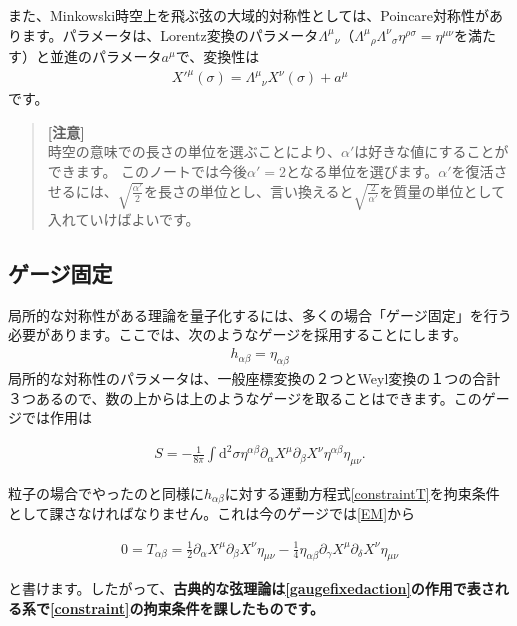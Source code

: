 \documentclass[report,paper=a4, fontsize=12pt, line_length=16cm, number_of_lines=34,dvipdfmx]{jlreq}
\newenvironment{important}{\begin{tcolorbox}[
  colback = white,
  colframe = red!35,
  boxrule = 2mm,
  fonttitle = \bfseries,
  after = \noindent] }{\end{tcolorbox}}
\numberwithin{equation}{chapter}
\numberwithin{equation}{section}
\newcommand{\del}{\partial}
\newcommand{\kyou}[1]{{\sffamily \bfseries #1}}
\newenvironment{remark}{\begin{quote}\small\textbf{[注意]}\\ }{\end{quote}}
\newcommand{\di}{\mathrm{d}}
\begin{document}
また、Minkowski時空上を飛ぶ弦の大域的対称性としては、Poincare対称性があります。パラメータは、Lorentz変換のパラメータ$\Lambda^{\mu}{}_{\nu}$（$\Lambda^{\mu}{}_{\rho}\Lambda^{\nu}{}_{\sigma}\eta^{\rho\sigma}=\eta^{\mu\nu}$を満たす）と並進のパラメータ$a^{\mu}$で、変換性は
\begin{align}
X'^{\mu}(\sigma)=\Lambda^{\mu}{}_{\nu}X^{\nu}(\sigma)+a^{\mu}
\end{align}
です。
\begin{remark}
時空の意味での長さの単位を選ぶことにより、$\alpha'$は好きな値にすることができます。
このノートでは今後$\alpha'=2$となる単位を選びます。$\alpha'$を復活させるには、$\sqrt{\frac{\alpha'}{2}}$を長さの単位とし、言い換えると$\sqrt{\frac{2}{\alpha'}}$を質量の単位として入れていけばよいです。
\end{remark}

\subsection{ゲージ固定}
局所的な対称性がある理論を量子化するには、多くの場合「ゲージ固定」を行う必要があります。ここでは、次のようなゲージを採用することにします。
\begin{align}
h_{\alpha\beta}=\eta_{\alpha\beta}
\end{align}
局所的な対称性のパラメータは、一般座標変換の２つとWeyl変換の１つの合計３つあるので、数の上からは上のようなゲージを取ることはできます。このゲージでは作用は
\begin{important}
  \begin{align}
    S=-\frac{1}{8\pi}\int \di^2\sigma \eta^{\alpha\beta}\del_{\alpha}X^{\mu}\del_{\beta}X^{\nu}\eta^{\alpha\beta}\eta_{\mu\nu}.\label{gaugefixedaction}
    \end{align}      
\end{important}
粒子の場合でやったのと同様に$h_{\alpha\beta}$に対する運動方程式\eqref{constraintT}を拘束条件として課さなければなりません。これは今のゲージでは\eqref{EM}から
\begin{important}
  \begin{align}
    0=T_{\alpha\beta}=
    \frac12 \del_{\alpha}X^{\mu}\del_{\beta}X^{\nu}\eta_{\mu\nu}
    -\frac14 \eta_{\alpha\beta}\del_{\gamma}X^{\mu}\del_{\delta}X^{\nu}\eta_{\mu\nu}\label{constraint}
    \end{align}      
\end{important}
と書けます。したがって、\kyou{古典的な弦理論は\eqref{gaugefixedaction}の作用で表される系で\eqref{constraint}の拘束条件を課したものです。}
\end{document}
